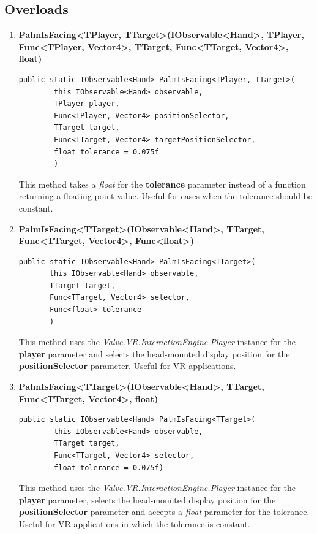 \documentclass[12pt,a4paper,twoside]{report}
\begin{document}
\subsection{Overloads}
\begin{enumerate}
    \item \textbf{PalmIsFacing<TPlayer, TTarget>(IObservable<Hand>, TPlayer, Func<TPlayer, Vector4>, TTarget, Func<TTarget, Vector4>, float)}
\begin{lstlisting}[caption=Declaration]
     public static IObservable<Hand> PalmIsFacing<TPlayer, TTarget>(
        this IObservable<Hand> observable,
        TPlayer player,
        Func<TPlayer, Vector4> positionSelector,
        TTarget target,
        Func<TTarget, Vector4> targetPositionSelector,
        float tolerance = 0.075f
        )
\end{lstlisting}
    This method takes a \textit{float} for the \textbf{tolerance} parameter instead of a function returning a floating point value. Useful for cases when the tolerance should be constant.

    \item \textbf{PalmIsFacing<TTarget>(IObservable<Hand>, TTarget, Func<TTarget, Vector4>, Func<float>)}
\begin{lstlisting}[caption=Declaration]
   public static IObservable<Hand> PalmIsFacing<TTarget>(
       this IObservable<Hand> observable,
       TTarget target,
       Func<TTarget, Vector4> selector,
       Func<float> tolerance
       )
\end{lstlisting}
    This method uses the \textit{Valve.VR.InteractionEngine.Player} instance for the \textbf{player} parameter and selects the head-mounted display position for the \textbf{positionSelector} parameter. Useful for VR applications.
    
    \item \textbf{PalmIsFacing<TTarget>(IObservable<Hand>, TTarget, Func<TTarget, Vector4>, float)}
\begin{lstlisting}[caption=Declaration]
    public static IObservable<Hand> PalmIsFacing<TTarget>(
        this IObservable<Hand> observable,
        TTarget target,
        Func<TTarget, Vector4> selector,
        float tolerance = 0.075f)
\end{lstlisting}
    This method uses the \textit{Valve.VR.InteractionEngine.Player} instance for the \textbf{player} parameter, selects the head-mounted display position for the \textbf{positionSelector} parameter and accepts a \textit{float} parameter for the tolerance. Useful for VR applications in which the tolerance is constant.
\end{enumerate}
\end{document}
